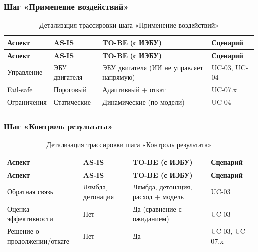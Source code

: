 \documentclass[14pt, a4paper]{extarticle}
\begin{document}
				\subsubsection{Шаг «Применение воздействий»}
				
				{\fontsize{9}{11}\selectfont
					\begin{xltabular}{\textwidth}{|L|L|L|L|}
					\caption{Детализация трассировки шага «Применение воздействий»}\label{tab:trace-apply}\\
					\hline
					\textbf{Аспект} & \textbf{AS-IS} & \textbf{TO-BE (с ИЭБУ)} & \textbf{Сценарий} \\
					\hline
					\endfirsthead
					\hline
					\textbf{Аспект} & \textbf{AS-IS} & \textbf{TO-BE (с ИЭБУ)} & \textbf{Сценарий} \\
					\hline
					\endhead
					\hline
					\endfoot
					\hline
					\endlastfoot
					Управление & ЭБУ двигателя & ЭБУ двигателя (ИИ не управляет напрямую) & UC-03, UC-04 \\
					\hline
					Fail-safe & Пороговый & Адаптивный + откат & UC-07.x \\
					\hline
					Ограничения & Статические & Динамические (по модели) & UC-04 \\
					\hline
				\end{xltabular}}
				
				\subsubsection{Шаг «Контроль результата»}
				
				{\fontsize{9}{11}\selectfont
					\begin{xltabular}{\textwidth}{|L|L|L|L|}
					\caption{Детализация трассировки шага «Контроль результата»}\label{tab:trace-control}\\
					\hline
					\textbf{Аспект} & \textbf{AS-IS} & \textbf{TO-BE (с ИЭБУ)} & \textbf{Сценарий} \\
					\hline
					\endfirsthead
					\hline
					\textbf{Аспект} & \textbf{AS-IS} & \textbf{TO-BE (с ИЭБУ)} & \textbf{Сценарий} \\
					\hline
					\endhead
					\hline
					\endfoot
					\hline
					\endlastfoot
					Обратная связь & Лямбда, детонация & Лямбда, детонация, расход + модель & UC-03 \\
					\hline
					Оценка эффективности & Нет & Да (сравнение с ожиданием) & UC-03 \\
					\hline
					Решение о продолжении/откате & Нет & Да & UC-03, UC-07.x \\
					\hline
				\end{xltabular}}
				
\end{document}

